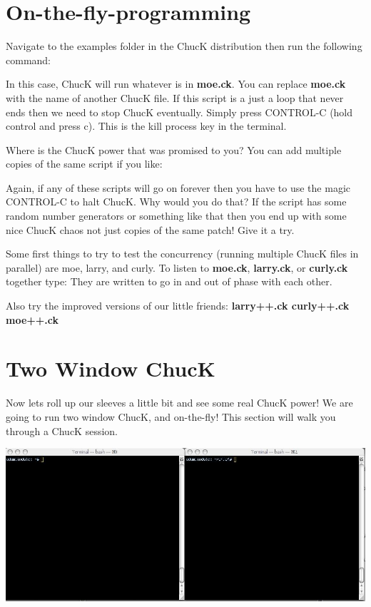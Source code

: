 \section{On-the-fly-programming}

Navigate to the examples folder in the ChucK distribution then run the following command:


In this case, ChucK will run whatever is in {\bf moe.ck}. You can replace {\bf moe.ck} with the name of another ChucK file. If this script is a just a loop that never ends then we need to stop ChucK eventually. Simply press CONTROL-C (hold control and press c). This is the kill process key in the terminal. 

Where is the ChucK power that was promised to you? You can add multiple copies of the same script if you like: 


Again, if any of these scripts will go on forever then you have to use the magic CONTROL-C to halt ChucK. Why would you do that? If the script has some random number generators or something like that then you end up with some nice ChucK chaos not just copies of the same patch! Give it a try. 

Some first things to try to test the concurrency (running multiple ChucK files in parallel) are moe, larry, and curly. To listen to {\bf moe.ck}, {\bf larry.ck}, or {\bf curly.ck} together type: They are written to go in and out of phase with each other. 

Also try the improved versions of our little friends: {\bf larry++.ck curly++.ck moe++.ck} 

\section*{Two Window ChucK}
Now lets roll up our sleeves a little bit and see some real ChucK power! We are going to run two window ChucK, and on-the-fly! This section will walk you through a ChucK session. 

\includegraphics[width=\textwidth]{images/2term}

